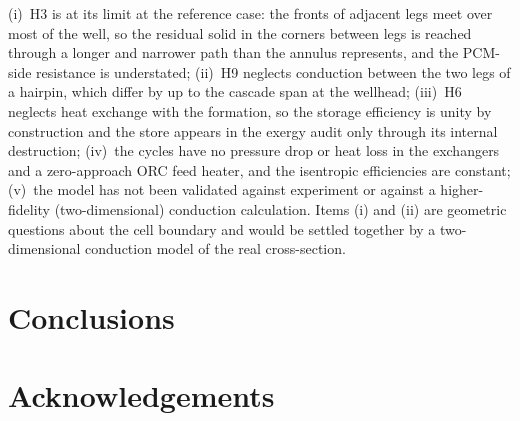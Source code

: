 (i)~H3 is at its limit at the reference case: the fronts of adjacent legs
meet over most of the well, so the residual solid in the corners between legs
is reached through a longer and narrower path than the annulus represents,
and the PCM-side resistance is understated;
(ii)~H9 neglects conduction between the two legs of a hairpin, which differ
by up to the cascade span at the wellhead;
(iii)~H6 neglects heat exchange with the formation, so the storage efficiency
is unity by construction and the store appears in the exergy audit only through
its internal destruction;
(iv)~the cycles have no pressure drop or heat loss in the exchangers and a
zero-approach ORC feed heater, and the isentropic efficiencies are constant;
(v)~the model has not been validated against experiment or against a
higher-fidelity (two-dimensional) conduction calculation. Items (i) and (ii)
are geometric questions about the cell boundary and would be settled together
by a two-dimensional conduction model of the real cross-section.

\section{Conclusions}
\label{sec:conclusions}

\section*{Acknowledgements}

